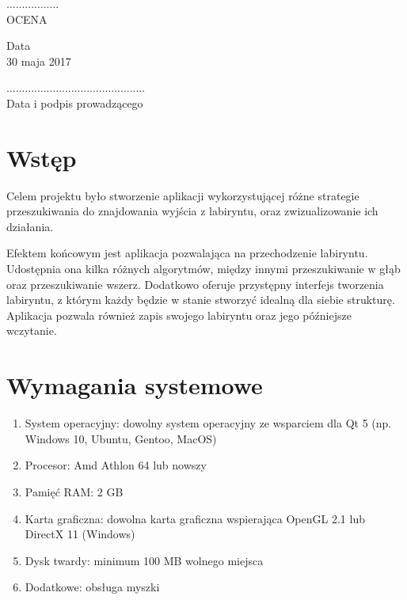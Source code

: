 \documentclass[12pt,a4paper]{article}
\newcommand{\datazajec}{30 maja 2017}
\begin{document}
	\begin{flushright}
		\begin{minipage}[t]{0.3\linewidth}
			\centering
			................. \\
			\small OCENA
		\end{minipage}
	\end{flushright}
	
	\begin{minipage}[t]{0.4\linewidth}
		\centering
		Data \\
		\small \datazajec
	\end{minipage}
	
	\begin{flushright}
		\begin{minipage}[t]{0.5\linewidth}
			\centering
			............................................. \\
			\small \textsf{Data i podpis prowadzącego}
		\end{minipage}
	\end{flushright}
	\pagebreak

	\tableofcontents

	\pagebreak

	
	\section{Wstęp}
	Celem projektu było stworzenie aplikacji wykorzystującej różne
	strategie przeszukiwania do znajdowania wyjścia z labiryntu, oraz
	zwizualizowanie ich działania.
	
	Efektem końcowym jest aplikacja pozwalająca na przechodzenie
	labiryntu. Udostępnia ona kilka różnych algorytmów, między innymi
	przeszukiwanie w głąb oraz przeszukiwanie wszerz. Dodatkowo oferuje
	przystępny interfejs tworzenia labiryntu, z którym każdy będzie w
	stanie stworzyć idealną dla siebie strukturę. Aplikacja pozwala
	również zapis swojego labiryntu oraz jego późniejsze wczytanie.
	\medskip
	\section{Wymagania systemowe}
		\begin{enumerate}[label=•]
			\item System operacyjny: dowolny system operacyjny ze 
				wsparciem dla Qt 5 (np. Windows 10, Ubuntu, Gentoo, 
				MacOS)
			\item Procesor: Amd Athlon 64 lub nowszy
			\item Pamięć RAM: 2 GB
			\item Karta graficzna: dowolna karta graficzna wspierająca
				OpenGL 2.1 lub DirectX 11 (Windows)
			\item Dysk twardy: minimum 100 MB wolnego miejsca
			\item Dodatkowe: obsługa myszki
		\end{enumerate}
		
\end{document}
